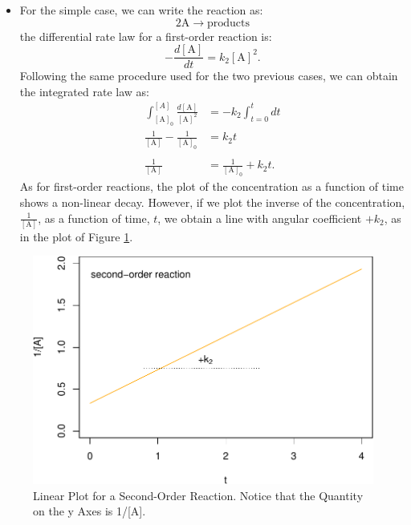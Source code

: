 \documentclass[
  9pt,
]{extbook}
\providecommand{\tightlist}{%
  \setlength{\itemsep}{0pt}\setlength{\parskip}{0pt}}
\theoremstyle{definition}
\theoremstyle{definition}
\theoremstyle{definition}
\theoremstyle{remark}
\begin{document}
\begin{itemize}
\tightlist
\item
  For the simple case, we can write the reaction as:
  \begin{equation}
  2\mathrm{A}\rightarrow \text{products}
  \end{equation}
  the differential rate law for a first-order reaction is:
  \begin{equation}
  -\frac{d[\mathrm{A}]}{dt}=k_2 [\mathrm{A}]^2.
  \label{eq:kin10}
  \end{equation}
  Following the same procedure used for the two previous cases, we can obtain the integrated rate law as:
  \begin{equation}
  \begin{aligned}
  \int_{[\mathrm{A}]_0}^{[A]} \frac{d[\mathrm{A}]}{[\mathrm{A}]^2} &= -k_2 \int_{t=0}^{t} dt \\
  \frac{1}{[\mathrm{A}]}-\frac{1}{[\mathrm{A}]_0} &= k_2 t\\ \\
  \frac{1}{[\mathrm{A}]}&=\frac{1}{[\mathrm{A}]_0} + k_2 t.
  \end{aligned}
  \label{eq:kin11}
  \end{equation}
  As for first-order reactions, the plot of the concentration as a function of time shows a non-linear decay. However, if we plot the inverse of the concentration, \(\frac{1}{[\mathrm{A}]}\), as a function of time, \(t\), we obtain a line with angular coefficient \(+k_2\), as in the plot of Figure \ref{fig:figk4}.
\end{itemize}

\begin{figure}

{\centering \includegraphics{pchem1_files/figure-latex/figk4-1} 

}

\caption{Linear Plot for a Second-Order Reaction. Notice that the Quantity on the y Axes is 1/[A].}\label{fig:figk4}
\end{figure}
\end{document}
